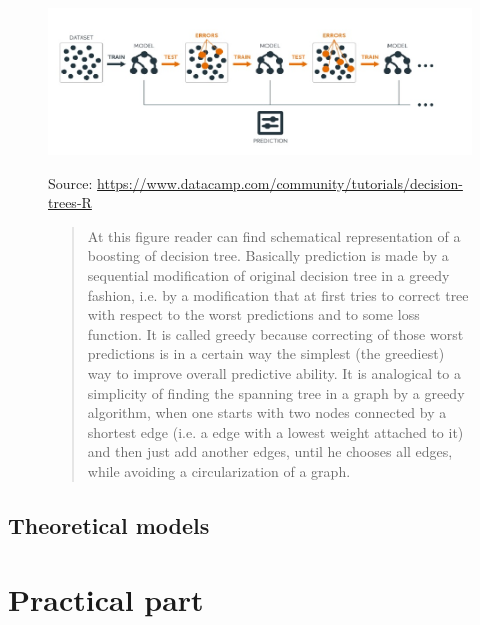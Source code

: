 \documentclass[12pt, twoside]{book} %
\begin{document}
\begin{figure}[H]
\includegraphics[width=\textwidth]{boosting_scheme.jpg}
{\small Source: \url{https://www.datacamp.com/community/tutorials/decision-trees-R} \newline
 \begin{quotation}
At this figure reader can find schematical representation of a boosting of decision tree. Basically prediction is made by a sequential modification of original decision tree in a greedy fashion, i.e. by a modification that at first tries to correct tree with respect to the worst predictions and to some loss function. It is called greedy because correcting of those worst predictions is in a certain way the simplest (the greediest) way to improve overall predictive ability. It is analogical to a simplicity of finding the spanning tree in a graph by a greedy algorithm, when one starts with two nodes connected by a shortest edge (i.e. a edge with a lowest weight attached to it) and then just add another edges, until he chooses all edges, while avoiding a circularization of a graph.
\end{quotation}
 }
\end{figure}


\section{Theoretical models}    %




















\chapter{Practical part}        %
\label{2}
\end{document}
